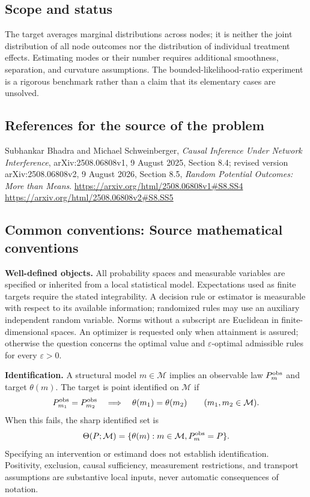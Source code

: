 \documentclass[11pt,a4paper]{article}
\begin{document}
\subsection*{Scope and status}
The target averages marginal distributions across nodes; it is neither the joint distribution of all node outcomes nor the distribution of individual treatment effects. Estimating modes or their number requires additional smoothness, separation, and curvature assumptions. The bounded-likelihood-ratio experiment is a rigorous benchmark rather than a claim that its elementary cases are unsolved.
\subsection*{References for the source of the problem}
Subhankar Bhadra and Michael Schweinberger, \emph{Causal Inference Under Network Interference}, arXiv:2508.06808v1, 9 August 2025, Section 8.4; revised version arXiv:2508.06808v2, 9 August 2026, Section 8.5, \emph{Random Potential Outcomes: More than Means}.
\url{https://arxiv.org/html/2508.06808v1#S8.SS4}
\url{https://arxiv.org/html/2508.06808v2#S8.SS5}

\subsection*{Common conventions: Source mathematical conventions}

\textbf{Well-defined objects.}
All probability spaces and measurable variables are specified or inherited
from a local statistical model. Expectations used as finite targets require
the stated integrability. A decision rule or estimator is measurable with
respect to its available information; randomized rules may use an auxiliary
independent random variable. Norms without a subscript are Euclidean in
finite-dimensional spaces. An optimizer is requested only when attainment
is assured; otherwise the question concerns the optimal value and
$\varepsilon$-optimal admissible rules for every $\varepsilon>0$.

\textbf{Identification.}
A structural model $m\in\mathcal M$ implies an observable law
$P_m^{\rm obs}$ and target $\theta(m)$. The target is point identified on
$\mathcal M$ if
\[
 P_{m_1}^{\rm obs}=P_{m_2}^{\rm obs}
 \quad\Longrightarrow\quad\theta(m_1)=\theta(m_2)
 \qquad(m_1,m_2\in\mathcal M).
\]
When this fails, the sharp identified set is
\[
 \Theta(P;\mathcal M)=\{\theta(m):m\in\mathcal M,
                                  P_m^{\rm obs}=P\}.
\]
Specifying an intervention or estimand does not establish identification.
Positivity, exclusion, causal sufficiency, measurement restrictions, and
transport assumptions are substantive local inputs, never automatic
consequences of notation.
\end{document}
